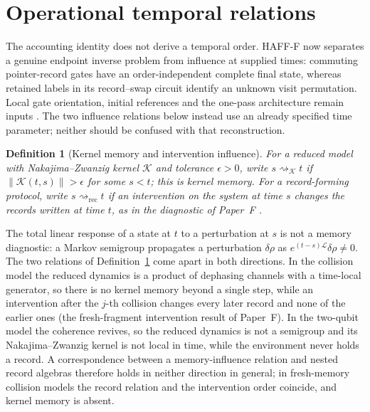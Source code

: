 \documentclass[12pt]{article}
\newtheorem{definition}[theorem]{Definition}
\begin{document}
\section{Operational temporal relations}
\label{sec:arrow}

The accounting identity does not derive a temporal order. HAFF-F now
separates a genuine endpoint inverse problem from influence at supplied
times: commuting pointer-record gates have an order-independent complete
final state, whereas retained labels in its record--swap circuit identify
an unknown visit permutation. Local gate orientation, initial references
and the one-pass architecture remain inputs \cite{Liu2026HAFF_F}.
The two influence relations below instead use an already specified
time parameter; neither should be confused with that reconstruction.

\begin{definition}[Kernel memory and intervention influence]
\label{def:memory_order}
For a reduced model with Nakajima--Zwanzig kernel $\mathcal K$ and tolerance $\epsilon>0$, write $s\rightsquigarrow_{\mathcal K}t$ if $\|\mathcal K(t,s)\|>\epsilon$ for some $s<t$; this is kernel memory. For a record-forming protocol, write $s\rightsquigarrow_{\mathrm{rec}}t$ if an intervention on the system at time $s$ changes the records written at time $t$, as in the diagnostic of Paper~F \cite{Liu2026HAFF_F}.
\end{definition}

The total linear response of a state at $t$ to a perturbation at $s$ is not a memory diagnostic: a Markov semigroup propagates a perturbation $\delta\rho$ as $e^{(t-s)\mathcal L}\delta\rho\neq0$. The two relations of Definition~\ref{def:memory_order} come apart in both directions. In the collision model the reduced dynamics is a product of dephasing channels with a time-local generator, so there is no kernel memory beyond a single step, while an intervention after the $j$-th collision changes every later record and none of the earlier ones (the fresh-fragment intervention result of Paper~F). In the two-qubit model the coherence revives, so the reduced dynamics is not a semigroup and its Nakajima--Zwanzig kernel is not local in time, while the environment never holds a record. A correspondence between a memory-influence relation and nested record algebras therefore holds in neither direction in general; in fresh-memory collision models the record relation and the intervention order coincide, and kernel memory is absent.
\end{document}
